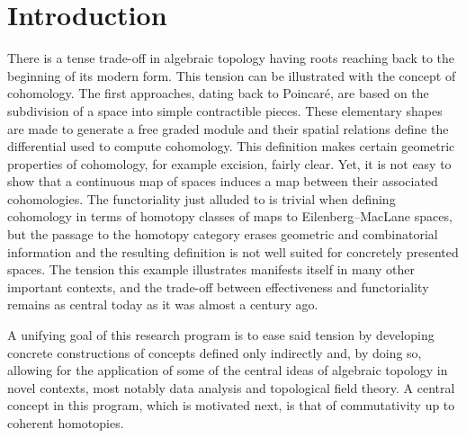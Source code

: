 \section*{Introduction} \label{s:introduction}

There is a tense trade-off in algebraic topology having roots reaching back to the beginning of its modern form.
This tension can be illustrated with the concept of cohomology.
The first approaches, dating back to Poincar\'e, are based on the subdivision of a space into simple contractible pieces.
These elementary shapes are made to generate a free graded module and their spatial relations define the differential used to compute cohomology.
This definition makes certain geometric properties of cohomology, for example excision, fairly clear.
Yet, it is not easy to show that a continuous map of spaces induces a map between their associated cohomologies.
The functoriality just alluded to is trivial when defining cohomology in terms of homotopy classes of maps to Eilenberg--MacLane spaces, but the passage to the homotopy category erases geometric and combinatorial information and the resulting definition is not well suited for concretely presented spaces.
The tension this example illustrates manifests itself in many other important contexts, and the trade-off between effectiveness and functoriality remains as central today as it was almost a century ago.

A unifying goal of this research program is to ease said tension by developing concrete constructions of concepts defined only indirectly and, by doing so, allowing for the application of some of the central ideas of algebraic topology in novel contexts, most notably data analysis and topological field theory.
A central concept in this program, which is motivated next, is that of commutativity up to coherent homotopies.

